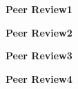 \documentclass{article}
\begin{document}




  
  

\newpage
\textbf{Peer Review1}\label{review1}


\newpage
\textbf{Peer Review2}\label{review2}


\newpage
\textbf{Peer Review3}\label{review3}


\newpage
\textbf{Peer Review4}\label{review4}

\end{document}

